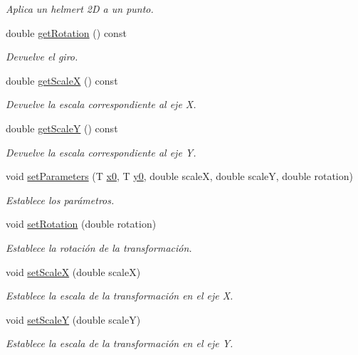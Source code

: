 \begin{DoxyCompactItemize}
\begin{DoxyCompactList}\small\item\em Aplica un helmert 2D a un punto. \end{DoxyCompactList}\item 
double \hyperlink{class_i3_d_1_1_afin_a72b19e66437e67f73b1f0a95eaa91c3f}{get\+Rotation} () const 
\begin{DoxyCompactList}\small\item\em Devuelve el giro. \end{DoxyCompactList}\item 
double \hyperlink{class_i3_d_1_1_afin_a1a4c447002e10793a6c187e028a50a13}{get\+ScaleX} () const 
\begin{DoxyCompactList}\small\item\em Devuelve la escala correspondiente al eje X. \end{DoxyCompactList}\item 
double \hyperlink{class_i3_d_1_1_afin_ad26bedc7f15fdd7e497b58cdb069cb7c}{get\+ScaleY} () const 
\begin{DoxyCompactList}\small\item\em Devuelve la escala correspondiente al eje Y. \end{DoxyCompactList}\item 
void \hyperlink{group__trf2_d_group_gaa6f479027bc96a8d58eaf52925822ecc}{set\+Parameters} (T \hyperlink{class_i3_d_1_1_afin_aff62b2c4443c19c78940f4113e67183b}{x0}, T \hyperlink{class_i3_d_1_1_afin_ac687b5efb2b75262c7aeeb31a2792c34}{y0}, double scaleX, double scaleY, double rotation)
\begin{DoxyCompactList}\small\item\em Establece los parámetros. \end{DoxyCompactList}\item 
void \hyperlink{group__trf2_d_group_ga07de5ad4be2f59ff5baa9b293211554d}{set\+Rotation} (double rotation)
\begin{DoxyCompactList}\small\item\em Establece la rotación de la transformación. \end{DoxyCompactList}\item 
void \hyperlink{group__trf2_d_group_ga33b6c90a0d7d957adb192d7768b574a1}{set\+ScaleX} (double scaleX)
\begin{DoxyCompactList}\small\item\em Establece la escala de la transformación en el eje X. \end{DoxyCompactList}\item 
void \hyperlink{group__trf2_d_group_ga2795a27b71c8e6364e71b828e042b6d7}{set\+ScaleY} (double scaleY)
\begin{DoxyCompactList}\small\item\em Establece la escala de la transformación en el eje Y. \end{DoxyCompactList}\end{DoxyCompactItemize}
